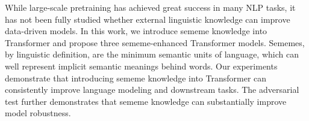 While large-scale pretraining has achieved great success in many NLP tasks, it has not been fully studied whether external linguistic knowledge can improve data-driven models. In this work, we introduce sememe knowledge into Transformer and propose three sememe-enhanced Transformer models. Sememes, by linguistic definition, are the minimum semantic units of language, which can well represent implicit semantic meanings behind words. Our experiments demonstrate that introducing sememe knowledge into Transformer can consistently improve language modeling and downstream tasks. The adversarial test further demonstrates that sememe knowledge can substantially improve model robustness.
